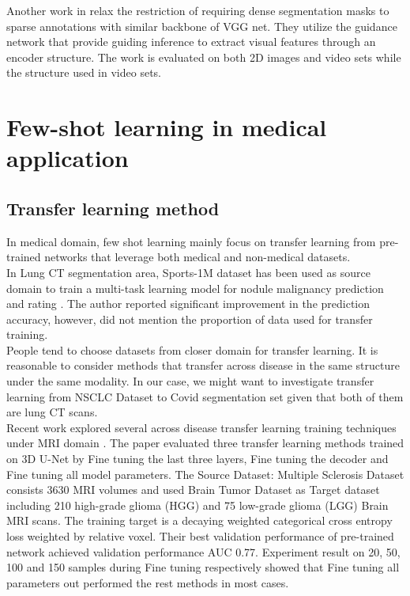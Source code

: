 Another work in \cite{rakelly_few-shot_nodate} relax the restriction of requiring dense segmentation masks to sparse annotations with similar backbone of VGG net. They utilize the guidance network that provide guiding inference to extract visual features through an encoder structure. The work is evaluated on both 2D images and video sets while the structure used in video sets.\\



\section{Few-shot learning in medical application}
\subsection{Transfer learning method}
In medical domain, few shot learning mainly focus on transfer learning from pre-trained networks that leverage both medical and non-medical datasets.\\


In Lung CT segmentation area, Sports-1M dataset has been used as source domain to train a multi-task learning model for nodule malignancy prediction and rating \cite{hussein_risk_2017}. The author reported significant improvement in the prediction accuracy, however, did not mention the proportion of data used for transfer training.\\

People tend to choose datasets from closer domain for transfer learning. It is reasonable to consider methods that transfer across disease in the same structure under the same modality. In our case, we might want to investigate transfer learning from NSCLC Dataset to Covid segmentation set given that both of them are lung CT scans.\\

Recent work explored several across disease transfer learning training techniques under MRI domain \cite{wang_improving_2019}. The paper evaluated three transfer learning methods trained on 3D U-Net by Fine tuning the last three layers, Fine tuning the decoder and Fine tuning all model parameters. 
The Source Dataset: Multiple Sclerosis Dataset consists 3630 MRI volumes and used Brain Tumor Dataset as Target dataset including 210 high-grade glioma (HGG) and 75 low-grade glioma (LGG) Brain MRI scans. The training target is a decaying weighted categorical cross entropy loss weighted by relative voxel. Their best validation performance of pre-trained network achieved validation performance AUC 0.77. Experiment result on 20, 50, 100 and 150 samples during Fine tuning respectively showed that Fine tuning all parameters out performed the rest methods in most cases.\\

